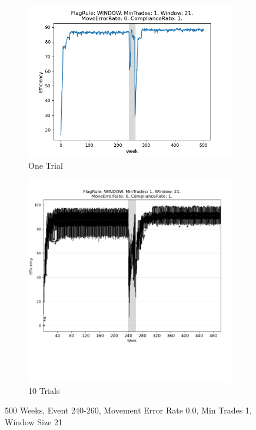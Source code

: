 \documentclass{article}%
\begin{document}
%


\begin{figure}[!htb]%
\begin{subfigure}[b]{0.45\linewidth}%
\includegraphics[width=\linewidth]{2051fr_WINDOW_mt_1_ws_21_er_0_cr_1_t1.png}%
\caption{One Trial}%
\end{subfigure}%
\begin{subfigure}[b]{0.45\linewidth}%
\includegraphics[clip,width=\linewidth,trim=0 4cm 0 0]{2051fr_WINDOW_mt_1_ws_21_er_0_cr_1_t10.png}%
\caption{10 Trials}%
\end{subfigure}%
\caption{500 Weeks, Event 240{-}260, Movement Error Rate 0.0, Min Trades 1, Window Size 21}%
\end{figure}
\end{document}
